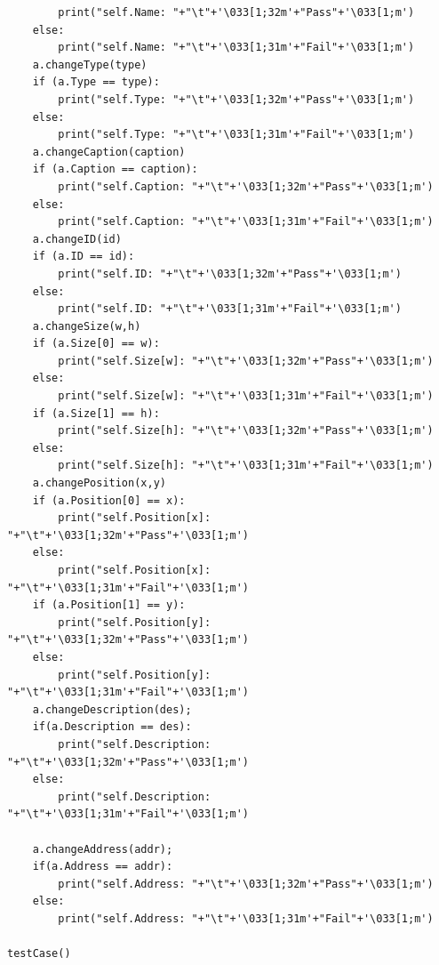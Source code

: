 \documentclass[journal,10pt,onecolumn,compsoc]{IEEEtran} \usepackage[margin=1.0in]{geometry} \usepackage{pdfpages}
\begin{document}
\begin{verbatim}
		print("self.Name: "+"\t"+'\033[1;32m'+"Pass"+'\033[1;m')
	else:
		print("self.Name: "+"\t"+'\033[1;31m'+"Fail"+'\033[1;m')
	a.changeType(type)
	if (a.Type == type):
		print("self.Type: "+"\t"+'\033[1;32m'+"Pass"+'\033[1;m')
	else:
		print("self.Type: "+"\t"+'\033[1;31m'+"Fail"+'\033[1;m')
	a.changeCaption(caption)
	if (a.Caption == caption):
		print("self.Caption: "+"\t"+'\033[1;32m'+"Pass"+'\033[1;m')
	else:
		print("self.Caption: "+"\t"+'\033[1;31m'+"Fail"+'\033[1;m')
	a.changeID(id)
	if (a.ID == id):
		print("self.ID: "+"\t"+'\033[1;32m'+"Pass"+'\033[1;m')
	else:
		print("self.ID: "+"\t"+'\033[1;31m'+"Fail"+'\033[1;m')
	a.changeSize(w,h)
	if (a.Size[0] == w):
		print("self.Size[w]: "+"\t"+'\033[1;32m'+"Pass"+'\033[1;m')
	else:
		print("self.Size[w]: "+"\t"+'\033[1;31m'+"Fail"+'\033[1;m')
	if (a.Size[1] == h):
		print("self.Size[h]: "+"\t"+'\033[1;32m'+"Pass"+'\033[1;m')
	else:
		print("self.Size[h]: "+"\t"+'\033[1;31m'+"Fail"+'\033[1;m')
	a.changePosition(x,y)
	if (a.Position[0] == x):
		print("self.Position[x]: "+"\t"+'\033[1;32m'+"Pass"+'\033[1;m')
	else:
		print("self.Position[x]: "+"\t"+'\033[1;31m'+"Fail"+'\033[1;m')
	if (a.Position[1] == y):
		print("self.Position[y]: "+"\t"+'\033[1;32m'+"Pass"+'\033[1;m')
	else:
		print("self.Position[y]: "+"\t"+'\033[1;31m'+"Fail"+'\033[1;m')
	a.changeDescription(des);
	if(a.Description == des):
		print("self.Description: "+"\t"+'\033[1;32m'+"Pass"+'\033[1;m')
	else:
		print("self.Description: "+"\t"+'\033[1;31m'+"Fail"+'\033[1;m')

	a.changeAddress(addr);
	if(a.Address == addr):
		print("self.Address: "+"\t"+'\033[1;32m'+"Pass"+'\033[1;m')
	else:
		print("self.Address: "+"\t"+'\033[1;31m'+"Fail"+'\033[1;m')

testCase()
\end{verbatim}
\end{document}

